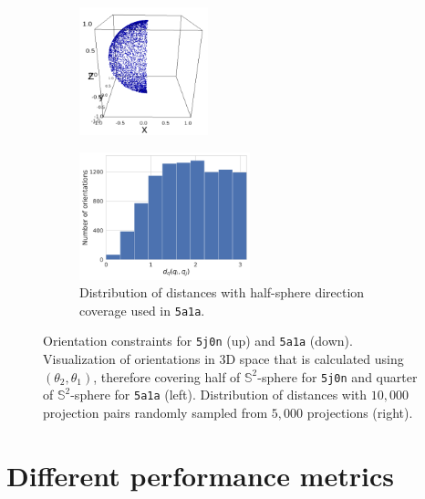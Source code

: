 \begin{figure}[ht!]
    \begin{subfigure}[b]{0.45\linewidth}
        \centering
        \includegraphics[height=10em]{figures/5a1a_quarter.png}
        \caption{}%
    \end{subfigure}
    \hfill
    \begin{subfigure}[b]{0.45\linewidth}
        \centering
        \includegraphics[height=10em]{figures/dQ_5a1a_quarter.pdf}
        \caption{Distribution of distances with half-sphere direction coverage used in \texttt{5a1a}.}%
    \end{subfigure}
    
     \caption{
        Orientation constraints for \texttt{5j0n} (up) and \texttt{5a1a} (down). 
        Visualization of orientations in 3D space that is calculated using $(\theta_2, \theta_1)$, therefore covering half of $\mathbb{S}^2$-sphere for \texttt{5j0n} and quarter of $\mathbb{S}^2$-sphere for \texttt{5a1a} (left).
        Distribution of distances with $10,000$ projection pairs randomly sampled from $5,000$ projections (right).
        }\label{fig:orientation-constraints}
\end{figure}



\section{Different performance metrics}\label{apx:metrics-review}


